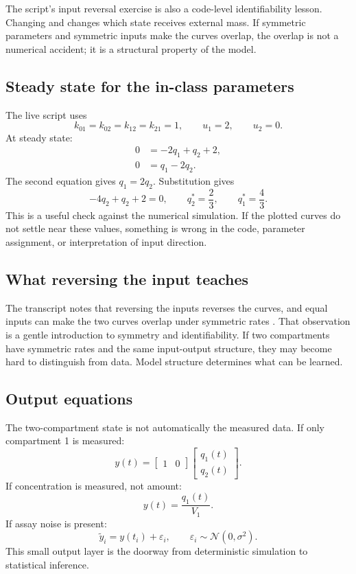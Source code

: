 \documentclass[a4paper]{article}
\newcommand{\Normal}{\mathcal{N}}
\newcommand{\qone}{q_1}
\newcommand{\qtwo}{q_2}
\newcommand{\code}[1]{\texttt{\detokenize{#1}}}
\begin{document}
The script's input reversal exercise is also a code-level identifiability lesson. Changing \code{IR1} and \code{IR2} changes which state receives external mass. If symmetric parameters and symmetric inputs make the curves overlap, the overlap is not a numerical accident; it is a structural property of the model.

\subsection{Steady state for the in-class parameters}

The live script uses
\[
  k_{01}=k_{02}=k_{12}=k_{21}=1,\qquad
  u_1=2,\qquad
  u_2=0.
\]
At steady state:
\[
  \begin{aligned}
  0&=-2\qone+\qtwo+2,\\
  0&=\qone-2\qtwo.
  \end{aligned}
\]
The second equation gives \(\qone=2\qtwo\). Substitution gives
\[
  -4\qtwo+\qtwo+2=0,
  \qquad
  \qtwo^*=\frac{2}{3},
  \qquad
  \qone^*=\frac{4}{3}.
\]
This is a useful check against the numerical simulation. If the plotted curves do not settle near these values, something is wrong in the code, parameter assignment, or interpretation of input direction.

\subsection{What reversing the input teaches}

The transcript notes that reversing the inputs reverses the curves, and equal inputs can make the two curves overlap under symmetric rates \cite{bmeg671TranscriptSep032025}. That observation is a gentle introduction to symmetry and identifiability. If two compartments have symmetric rates and the same input-output structure, they may become hard to distinguish from data. Model structure determines what can be learned.

\subsection{Output equations}

The two-compartment state is not automatically the measured data. If only compartment 1 is measured:
\[
  y(t)=
  \begin{bmatrix}1&0\end{bmatrix}
  \begin{bmatrix}\qone(t)\\ \qtwo(t)\end{bmatrix}.
\]
If concentration is measured, not amount:
\[
  y(t)=\frac{\qone(t)}{V_1}.
\]
If assay noise is present:
\[
  \tilde y_i = y(t_i)+\varepsilon_i,
  \qquad
  \varepsilon_i\sim\Normal(0,\sigma^2).
\]
This small output layer is the doorway from deterministic simulation to statistical inference.
\end{document}
